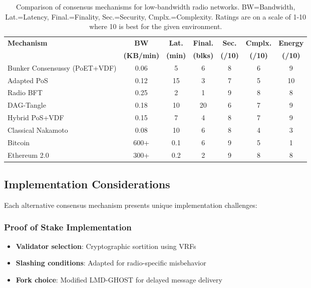 \documentclass[11pt,a4paper]{article}
\begin{document}
\begin{table}[h]
\centering
\begin{tabular}{|l|c|c|c|c|c|c|}
\hline
\textbf{Mechanism} & \textbf{BW} & \textbf{Lat.} & \textbf{Final.} & \textbf{Sec.} & \textbf{Cmplx.} & \textbf{Energy} \\
 & \textbf{(KB/min)} & \textbf{(min)} & \textbf{(blks)} & \textbf{(/10)} & \textbf{(/10)} & \textbf{(/10)} \\
\hline
Bunker Consensussy (PoET+VDF) & 0.06 & 5 & 6 & 8 & 6 & 9 \\
\hline
Adapted PoS & 0.12 & 15 & 3 & 7 & 5 & 10 \\
\hline
Radio BFT & 0.25 & 2 & 1 & 9 & 8 & 8 \\
\hline
DAG-Tangle & 0.18 & 10 & 20 & 6 & 7 & 9 \\
\hline
Hybrid PoS+VDF & 0.15 & 7 & 4 & 8 & 7 & 9 \\
\hline
Classical Nakamoto & 0.08 & 10 & 6 & 8 & 4 & 3 \\
\hline
Bitcoin & 600+ & 0.1 & 6 & 9 & 5 & 1 \\
\hline
Ethereum 2.0 & 300+ & 0.2 & 2 & 9 & 8 & 8 \\
\hline
\end{tabular}
\caption{Comparison of consensus mechanisms for low-bandwidth radio networks. BW=Bandwidth, Lat.=Latency, Final.=Finality, Sec.=Security, Cmplx.=Complexity. Ratings are on a scale of 1-10 where 10 is best for the given environment.}
\label{tab:consensus_comparison}
\end{table}

\subsection{Implementation Considerations}

Each alternative consensus mechanism presents unique implementation challenges:

\subsubsection{Proof of Stake Implementation}

\begin{itemize}
\item \textbf{Validator selection}: Cryptographic sortition using VRFs
\item \textbf{Slashing conditions}: Adapted for radio-specific misbehavior
\item \textbf{Fork choice}: Modified LMD-GHOST for delayed message delivery
\end{itemize}
\end{document}
